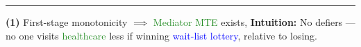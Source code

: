 \documentclass[dvipsnames]{beamer} %
\renewcommand{\vec}[1]{\boldsymbol{\mathit{#1}}}                           %
\newcommand{\Prob}[1]{\Pr\left( #1 \right)}                         %
\newcommand{\Cov}[1]{\text{Cov} \left( #1 \right)}                         %
\begin{document}
\begin{frame}
    \par\noindent\rule{\textwidth}{0.4pt}
    \pause
    \textbf{(1)} First-stage monotonicity $\implies$ \textcolor{ForestGreen}{Mediator MTE} exists,
    \vfill
    \textbf{Intuition:}
    No defiers --- no one visits \textcolor{ForestGreen}{healthcare} less if winning \textcolor{blue}{wait-list lottery}, relative to losing.
\end{frame}
\end{document}
